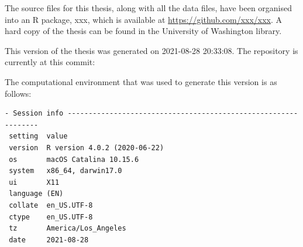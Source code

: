 \documentclass [11pt, proquest] {uwthesis}[2015/03/03]
\begin{document}
The source files for this thesis, along with all the data files, have
been organised into an R package, xxx, which is available at
\url{https://github.com/xxx/xxx}. A hard copy of the thesis can be found
in the University of Washington library.

This version of the thesis was generated on 2021-08-28 20:33:08. The
repository is currently at this commit:

The computational environment that was used to generate this version is
as follows:
\begin{verbatim}
- Session info ---------------------------------------------------------------
 setting  value                       
 version  R version 4.0.2 (2020-06-22)
 os       macOS Catalina 10.15.6      
 system   x86_64, darwin17.0          
 ui       X11                         
 language (EN)                        
 collate  en_US.UTF-8                 
 ctype    en_US.UTF-8                 
 tz       America/Los_Angeles         
 date     2021-08-28                  


\end{verbatim}
\end{document}
